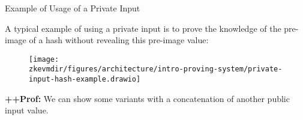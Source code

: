 \ifCOMMENT
\begin{frame}[fragile]{Example of Usage of a Private Input}

A typical example of using a private input is to prove the knowledge of
the pre-image of a hash without revealing this pre-image value:

\begin{figure}
\texttt{[image: \\zkevmdir/figures/architecture/intro-proving-system/private-input-hash-example.drawio]}
\end{figure}

\ifPROF
\vspace{0.2cm}
\scriptsize
\textbf{++Prof:} We can show some variants with a concatenation of another public input value.
\normalsize
\fi

\end{frame}







